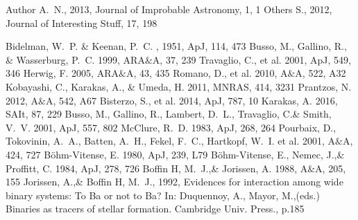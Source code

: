 \documentclass[a4paper,fleqn,usenatbib]{mnras}
\begin{document}
 


\begin{thebibliography}{99}
Author A.~N., 2013, Journal of Improbable Astronomy, 1, 1
Others S., 2012, Journal of Interesting Stuff, 17, 198


Bidelman, W.~P. \& Keenan, P.~C. , 1951, ApJ, 114, 473
Busso, M., Gallino, R., \& Wasserburg, P.~C. 1999, 
ARA$\&$A, 37, 239
Travaglio, C., et al. 2001, 
ApJ, 549, 346
Herwig, F. 2005, 
ARA$\&$A, 43, 435
Romano, D., et al. 2010, 
A$\&$A, 522, A32
Kobayashi, C., Karakas, A., \& Umeda, H. 2011, 
MNRAS, 414, 3231
Prantzos, N. 2012, 
A$\&$A, 542, A67
Bisterzo, S., et al. 2014, 
ApJ, 787, 10
Karakas, A. 2016, 
SAIt, 87, 229
Busso, M., Gallino, R., Lambert, D.~L., Travaglio, C.\& Smith, V.~V. 2001, 
ApJ, 557, 802
McClure, R.~D. 1983, 
ApJ, 268, 264
Pourbaix, D., Tokovinin, A.~A., Batten, A.~H., Fekel, F.~C., Hartkopf, W.~I. et al. 2001, 
A$\&$A, 424, 727
B\"ohm-Vitense, E. 1980, 
ApJ, 239, L79
B\"ohm-Vitense, E., Nemec, J.,\& Proffitt, C. 1984, 
ApJ, 278, 726
Boffin H, M.~J.,\& Jorissen, A. 1988, 
A$\&$A, 205, 155
Jorissen, A.,\& Boffin H, M.~J., 1992, 
Evidences for interaction among wide binary systems: To Ba or not to Ba? In: Duquennoy, A., Mayor, M.,(eds.) Binaries as tracers of stellar formation. Cambridge Univ. Press., p.185

\end{thebibliography}
\end{document}
